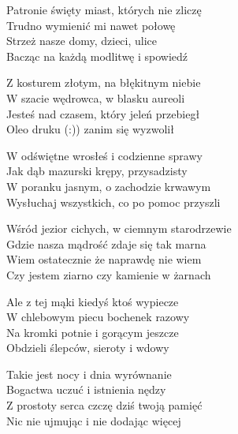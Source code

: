 \begin{text}
    Patronie święty miast, których nie zliczę\\
    Trudno wymienić mi nawet połowę\\
    Strzeż nasze domy, dzieci, ulice\\
    Bacząc na każdą modlitwę i spowiedź

    Z kosturem złotym, na błękitnym niebie\\
    W szacie wędrowca, w blasku aureoli\\
    Jesteś nad czasem, który jeleń przebiegł\\
    Oleo druku (:)) zanim się wyzwolił

    W odświętne wrosłeś i codzienne sprawy\\
    Jak dąb mazurski krępy, przysadzisty\\
    W poranku jasnym, o zachodzie krwawym\\
    Wysłuchaj wszystkich, co po pomoc przyszli

    Wśród jezior cichych, w ciemnym starodrzewie\\
    Gdzie nasza mądrość zdaje się tak marna\\
    Wiem ostatecznie że naprawdę nie wiem\\
    Czy jestem ziarno czy kamienie w żarnach

    Ale z tej mąki kiedyś ktoś wypiecze\\
    W chlebowym piecu bochenek razowy\\
    Na kromki potnie i gorącym jeszcze\\
    Obdzieli ślepców, sieroty i wdowy

    Takie jest nocy i dnia wyrównanie\\
    Bogactwa uczuć i istnienia nędzy\\
    Z prostoty serca czczę dziś twoją pamięć\\
    Nic nie ujmując i nie dodając więcej
\end{text}
\begin{chord}

\end{chord}